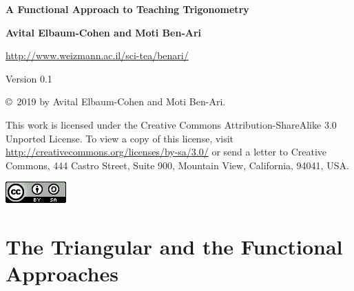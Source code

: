 
\hypersetup{pageanchor=false}
\thispagestyle{empty}

\vspace*{2ex}

\begin{center}


\textbf{\LARGE A Functional Approach to Teaching Trigonometry}

\bigskip
\bigskip
\bigskip
\bigskip

\textbf{\Large Avital Elbaum-Cohen and Moti Ben-Ari}

\bigskip
\bigskip

\url{http://www.weizmann.ac.il/sci-tea/benari/}

\bigskip

Version 0.1

\end{center}


\vfill

\begin{footnotesize}
\begin{center}
\copyright{}\ 2019 by Avital Elbaum-Cohen and Moti Ben-Ari.
\end{center}

This work is licensed under the Creative Commons Attribution-ShareAlike 3.0 Unported License. To view a copy of this license, visit \url{http://creativecommons.org/licenses/by-sa/3.0/} or send a letter to Creative Commons, 444 Castro Street, Suite 900, Mountain View, California, 94041, USA.
\end{footnotesize}

\bigskip

\begin{center}
\includegraphics[width=.15\textwidth]{../../by-sa.png}
\end{center}


\newpage
\thispagestyle{empty}

\tableofcontents
\thispagestyle{empty}


\newpage
\hypersetup{pageanchor=true}

\setcounter{page}{1}

\chapter{The Triangular and the Functional Approaches}

